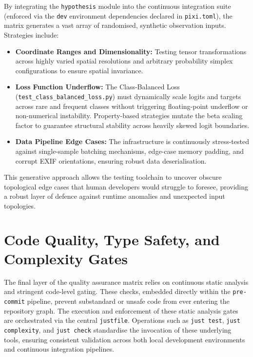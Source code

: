 By integrating the \texttt{hypothesis} module into the continuous integration suite (enforced via the \texttt{dev} environment dependencies declared in \texttt{pixi.toml}), the matrix generates a vast array of randomised, synthetic observation inputs. Strategies include:

\begin{itemize}
    \item \textbf{Coordinate Ranges and Dimensionality:} Testing tensor transformations across highly varied spatial resolutions and arbitrary probability simplex configurations to ensure spatial invariance.
    \item \textbf{Loss Function Underflow:} The Class-Balanced Loss (\texttt{test\_class\_balanced\_loss.py}) must dynamically scale logits and targets across rare and frequent classes without triggering floating-point underflow or non-numerical instability. Property-based strategies mutate the beta scaling factor to guarantee structural stability across heavily skewed logit boundaries.
    \item \textbf{Data Pipeline Edge Cases:} The infrastructure is continuously stress-tested against single-sample batching mechanisms, edge-case memory padding, and corrupt EXIF orientations, ensuring robust data deserialisation.
\end{itemize}

This generative approach allows the testing toolchain to uncover obscure topological edge cases that human developers would struggle to foresee, providing a robust layer of defence against runtime anomalies and unexpected input topologies.

\section{Code Quality, Type Safety, and Complexity Gates}
\label{sec:code_quality_gates}

The final layer of the quality assurance matrix relies on continuous static analysis and stringent code-level gating. These checks, embedded directly within the \texttt{pre-commit} pipeline, prevent substandard or unsafe code from ever entering the repository graph. The execution and enforcement of these static analysis gates are orchestrated via the central \texttt{justfile}. Operations such as \texttt{just test}, \texttt{just complexity}, and \texttt{just check} standardise the invocation of these underlying tools, ensuring consistent validation across both local development environments and continuous integration pipelines.

